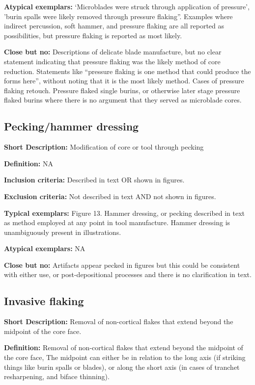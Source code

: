 \documentclass[
]{article}
\begin{document}
\textbf{Atypical exemplars:} `Microblades were struck through
application of pressure', 'burin spalls were likely removed through
pressure flaking''. Examples where indirect percussion, soft hammer, and
pressure flaking are all reported as possibilities, but pressure flaking
is reported as most likely.

\textbf{Close but no:} Descriptions of delicate blade manufacture, but
no clear statement indicating that pressure flaking was the likely
method of core reduction. Statements like ``pressure flaking is one
method that could produce the forms here'', without noting that it is
the most likely method. Cases of pressure flaking retouch. Pressure
flaked single burins, or otherwise later stage pressure flaked burins
where there is no argument that they served as microblade cores.

\subsection{Pecking/hammer dressing}\label{peckinghammer-dressing}

\textbf{Short Description:} Modification of core or tool through pecking

\textbf{Definition:} NA

\textbf{Inclusion criteria:} Described in text OR shown in figures.

\textbf{Exclusion criteria:} Not described in text AND not shown in
figures.

\textbf{Typical exemplars:} Figure 13. Hammer dressing, or pecking
described in text as method employed at any point in tool manufacture.
Hammer dressing is unambiguously present in illustrations.

\textbf{Atypical exemplars:} NA

\textbf{Close but no:} Artifacts appear pecked in figures but this could
be consistent with either use, or post-depositional processes and there
is no clarification in text.

\subsection{Invasive flaking}\label{invasive-flaking}

\textbf{Short Description:} Removal of non-cortical flakes that extend
beyond the midpoint of the core face.

\textbf{Definition:} Removal of non-cortical flakes that extend beyond
the midpoint of the core face, The midpoint can either be in relation to
the long axis (if striking things like burin spalls or blades), or along
the short axis (in cases of tranchet resharpening, and biface thinning).
\end{document}
